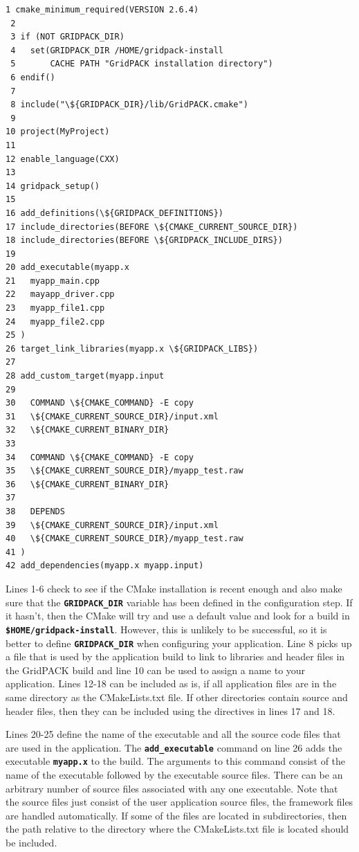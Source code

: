 \documentclass[12pt]{report} %
\begin{document}
{
\color{red}
\begin{Verbatim}[fontseries=b]
 1 cmake_minimum_required(VERSION 2.6.4)
 2
 3 if (NOT GRIDPACK_DIR)
 4   set(GRIDPACK_DIR /HOME/gridpack-install
 5       CACHE PATH "GridPACK installation directory")
 6 endif()
 7
 8 include("\${GRIDPACK_DIR}/lib/GridPACK.cmake")
 9
10 project(MyProject)
11
12 enable_language(CXX)
13
14 gridpack_setup()
15
16 add_definitions(\${GRIDPACK_DEFINITIONS})
17 include_directories(BEFORE \${CMAKE_CURRENT_SOURCE_DIR})
18 include_directories(BEFORE \${GRIDPACK_INCLUDE_DIRS})
19
20 add_executable(myapp.x
21   myapp_main.cpp
22   mayapp_driver.cpp
23   myapp_file1.cpp
24   myapp_file2.cpp
25 )
26 target_link_libraries(myapp.x \${GRIDPACK_LIBS})
27 
28 add_custom_target(myapp.input
29 
30   COMMAND \${CMAKE_COMMAND} -E copy 
31   \${CMAKE_CURRENT_SOURCE_DIR}/input.xml
32   \${CMAKE_CURRENT_BINARY_DIR}
33 
34   COMMAND \${CMAKE_COMMAND} -E copy 
35   \${CMAKE_CURRENT_SOURCE_DIR}/myapp_test.raw
36   \${CMAKE_CURRENT_BINARY_DIR}
37 
38   DEPENDS 
39   \${CMAKE_CURRENT_SOURCE_DIR}/input.xml
40   \${CMAKE_CURRENT_SOURCE_DIR}/myapp_test.raw
41 )
42 add_dependencies(myapp.x myapp.input)
\end{Verbatim}
}

Lines 1-6 check to see if the CMake installation is recent enough and also make sure that the \texttt{\textbf{GRIDPACK\_DIR}} variable has been defined in the configuration step. If it hasn't, then the CMake will try and use a default value and look for a build in\texttt{\textbf{ \$HOME/gridpack-install}}. However, this is unlikely to be successful, so it is better to define \texttt{\textbf{GRIDPACK\_DIR}} when configuring your application. Line 8 picks up a file that is used by the application build to link to libraries and header files in the GridPACK build and line 10 can be used to assign a name to your application. Lines 12-18 can be included as is, if all application files are in the same directory as the CMakeLists.txt file. If other directories contain source and header files, then they can be included using the directives in lines 17 and 18.

Lines 20-25 define the name of the executable and all the source code files that are used in the application. The \texttt{\textbf{add\_executable}} command on line 26 adds the executable \texttt{\textbf{myapp.x}} to the build. The arguments to this command consist of the name of the executable followed by the executable source files. There can be an arbitrary number of source files associated with any one executable. Note that the source files just consist of the user application source files, the framework files are handled automatically. If some of the files are located in subdirectories, then the path relative to the directory where the CMakeLists.txt file is located should be included.
\end{document}

